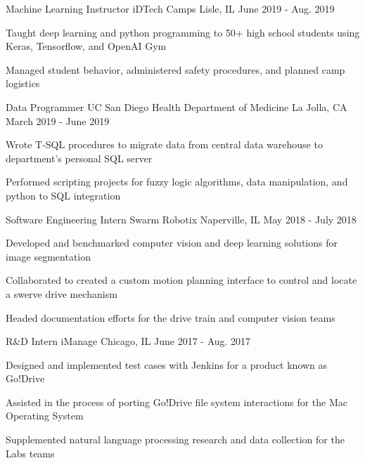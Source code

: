 
\begin{cventries}
  \cventry
    {Machine Learning Instructor} %
    {iDTech Camps} %
    {Lisle, IL} %
    {June 2019 - Aug. 2019} %
    {
      \begin{cvitems} %
        \item {Taught deep learning and python programming to 50+ high school students using Keras, Tensorflow, and OpenAI Gym}
        \item {Managed student behavior, administered safety procedures, and planned camp logistics}
      \end{cvitems}
    }

  \cventry
    {Data Programmer} %
    {UC San Diego Health Department of Medicine} %
    {La Jolla, CA} %
    {March 2019 - June 2019} %
    {
      \begin{cvitems} %
        \item {Wrote T-SQL procedures to migrate data from central data warehouse to department's personal SQL server}
        \item {Performed scripting projects for fuzzy logic algorithms, data manipulation, and python to SQL integration}
      \end{cvitems}
    }

  \cventry
    {Software Engineering Intern} %
    {Swarm Robotix} %
    {Naperville, IL} %
    {May 2018 - July 2018} %
    {
      \begin{cvitems} %
      	\item {Developed and benchmarked computer vision and deep learning solutions for image segmentation}
        \item {Collaborated to created a custom motion planning interface to control and locate a swerve drive mechanism}
        \item {Headed documentation efforts for the drive train and computer vision teams}
      \end{cvitems}
    }

  \cventry
    {R\&D Intern} %
    {iManage} %
    {Chicago, IL} %
    {June 2017 - Aug. 2017} %
    {
      \begin{cvitems} %
        \item {Designed and implemented test cases with Jenkins for a product known as Go!Drive}
		\item {Assisted in the process of porting Go!Drive file system interactions for the Mac Operating System}
		\item {Supplemented natural language processing research and data collection for the Labs teams}
      \end{cvitems}
    }

 
\end{cventries}
